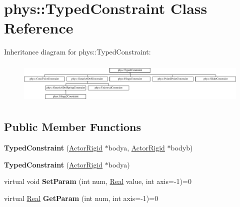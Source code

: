 \hypertarget{classphys_1_1TypedConstraint}{
\section{phys::TypedConstraint Class Reference}
\label{d1/d17/classphys_1_1TypedConstraint}
}
Inheritance diagram for phys::TypedConstraint:\begin{figure}[H]
\begin{center}
\leavevmode
\includegraphics[height=2.04566cm]{d1/d17/classphys_1_1TypedConstraint}
\end{center}
\end{figure}
\subsection*{Public Member Functions}
\begin{DoxyCompactItemize}
\item 
\hypertarget{classphys_1_1TypedConstraint_a50ca8631a6c75bbc609c8d4ed61fdcee}{
{\bfseries TypedConstraint} (\hyperlink{classphys_1_1ActorRigid}{ActorRigid} $\ast$bodya, \hyperlink{classphys_1_1ActorRigid}{ActorRigid} $\ast$bodyb)}
\label{d1/d17/classphys_1_1TypedConstraint_a50ca8631a6c75bbc609c8d4ed61fdcee}

\item 
\hypertarget{classphys_1_1TypedConstraint_a41ad08bfde377e91f2b37b0af40a9d34}{
{\bfseries TypedConstraint} (\hyperlink{classphys_1_1ActorRigid}{ActorRigid} $\ast$bodya)}
\label{d1/d17/classphys_1_1TypedConstraint_a41ad08bfde377e91f2b37b0af40a9d34}

\item 
\hypertarget{classphys_1_1TypedConstraint_a31a20a74094f0cb8e4f82d1f99725415}{
virtual void {\bfseries SetParam} (int num, \hyperlink{namespacephys_af7eb897198d265b8e868f45240230d5f}{Real} value, int axis=-\/1)=0}
\label{d1/d17/classphys_1_1TypedConstraint_a31a20a74094f0cb8e4f82d1f99725415}

\item 
\hypertarget{classphys_1_1TypedConstraint_ab6140d40e9476c3dc46e2802e8097421}{
virtual \hyperlink{namespacephys_af7eb897198d265b8e868f45240230d5f}{Real} {\bfseries GetParam} (int num, int axis=-\/1)=0}
\label{d1/d17/classphys_1_1TypedConstraint_ab6140d40e9476c3dc46e2802e8097421}

\end{DoxyCompactItemize}
